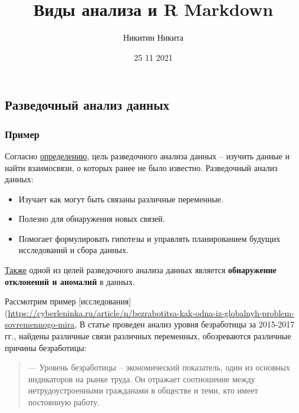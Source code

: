 \documentclass[
]{article}
\title{Виды анализа и R Markdown}
\author{Никитин Никита}
\date{25 11 2021}
\providecommand{\tightlist}{%
  \setlength{\itemsep}{0pt}\setlength{\parskip}{0pt}}
\begin{document}
\maketitle

\hypertarget{ux440ux430ux437ux432ux435ux434ux43eux447ux43dux44bux439-ux430ux43dux430ux43bux438ux437-ux434ux430ux43dux43dux44bux445}{%
\subsection{Разведочный анализ
данных}\label{ux440ux430ux437ux432ux435ux434ux43eux447ux43dux44bux439-ux430ux43dux430ux43bux438ux437-ux434ux430ux43dux43dux44bux445}}

\hypertarget{ux43fux440ux438ux43cux435ux440}{%
\subsubsection{Пример}\label{ux43fux440ux438ux43cux435ux440}}

Согласно
\href{http://domic.isu.ru/student/entity/5345/content/analysis.pdf}{определению},
цель разведочного анализа данных -- изучить данные и найти взаимосвязи,
о которых ранее не было известно. Разведочный анализ данных:

\begin{itemize}
\tightlist
\item
  Изучает как могут быть связаны различные переменные.
\item
  Полезно для обнаружения новых связей.
\item
  Помогает формулировать гипотезы и управлять планированием будущих
  исследований и сбора данных.
\end{itemize}

\href{https://ru.wikipedia.org/wiki/\%D0\%A0\%D0\%B0\%D0\%B7\%D0\%B2\%D0\%B5\%D0\%B4\%D0\%BE\%D1\%87\%D0\%BD\%D1\%8B\%D0\%B9_\%D0\%B0\%D0\%BD\%D0\%B0\%D0\%BB\%D0\%B8\%D0\%B7_\%D0\%B4\%D0\%B0\%D0\%BD\%D0\%BD\%D1\%8B\%D1\%85}{Также}
одной из целей разведочного анализа данных является \textbf{обнаружение
отклонений и аномалий} в данных.

Рассмотрим пример
{[}исследования{]}(\url{https://cyberleninka.ru/article/n/bezrabotitsa-kak-odna-iz-globalnyh-problem-sovremennogo-mira},
В статье проведен анализ уровня безработицы за 2015-2017 гг., найдены
различные связи различных переменных, обозреваются различные причины
безработицы:

\begin{quote}
--- Уровень безработицы -- экономический показатель, один из основных
индикаторов на рынке труда. Он отражает соотношение между
нетрудоустроенными гражданами в обществе и теми, кто имеет постоянную
работу.
\end{quote}
\end{document}
